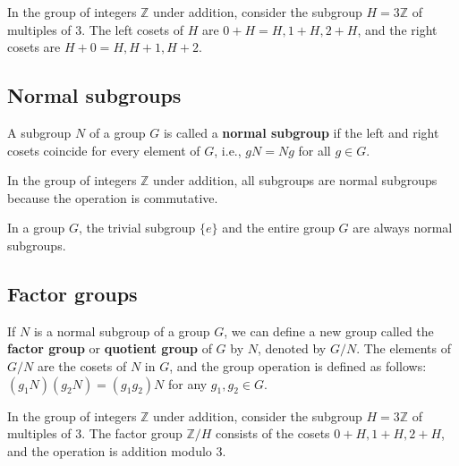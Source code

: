 \begin{example}
  In the group of integers $\mathbb{Z}$ under addition, consider the subgroup $H = 3\mathbb{Z}$ of multiples of 3. The left cosets of $H$ are $0 + H = H, 1 + H, 2 + H$, and the right cosets are $H + 0 = H, H + 1, H + 2$.
\end{example}

\subsection{Normal subgroups}
\begin{definition}
  A subgroup $N$ of a group $G$ is called a \textbf{normal subgroup} if the left and right cosets coincide for every element of $G$, i.e., $gN = Ng$ for all $g \in G$.
\end{definition}

\begin{example}
  In the group of integers $\mathbb{Z}$ under addition, all subgroups are normal subgroups because the operation is commutative.
\end{example}

\begin{example}
  In a group $G$, the trivial subgroup $\{e\}$ and the entire group $G$ are always normal subgroups.
\end{example}

\subsection{Factor groups}
\begin{definition}
  If $N$ is a normal subgroup of a group $G$, we can define a new group called the \textbf{factor group} or \textbf{quotient group} of $G$ by $N$, denoted by $G/N$. The elements of $G/N$ are the cosets of $N$ in $G$, and the group operation is defined as follows: $(g_1N)(g_2N) = (g_1g_2)N$ for any $g_1, g_2 \in G$.
\end{definition}

\begin{example}
  In the group of integers $\mathbb{Z}$ under addition, consider the subgroup $H = 3\mathbb{Z}$ of multiples of 3. The factor group $\mathbb{Z}/H$ consists of the cosets $0 + H, 1 + H, 2 + H$, and the operation is addition modulo 3.
\end{example}


